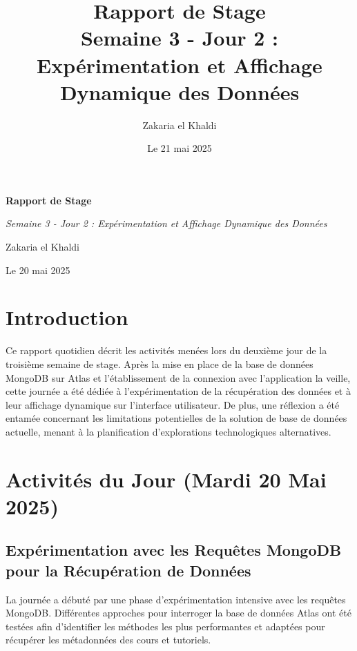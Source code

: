 \documentclass[12pt, a4paper]{article}
\title{\Huge\bfseries\color{primary} Rapport de Stage \\ 
      \Large Semaine 3 - Jour 2 : Expérimentation et Affichage Dynamique des Données} %
\author{\Large Zakaria el Khaldi}
\date{\large Le 21 mai 2025} %
\begin{document}
\begin{titlepage}
  \centering
  {\Huge\bfseries\color{primary} Rapport de Stage \par}
  \vspace{1cm}
  {\Large\itshape Semaine 3 - Jour 2 : Expérimentation et Affichage Dynamique des Données\par} %
  \vspace{2cm}
  
  \vspace{2cm}
  {\Large Zakaria el Khaldi\par}
  \vfill
  {\large Le 20 mai 2025\par} %
\end{titlepage}

\tableofcontents
\thispagestyle{empty}
\newpage

\section{Introduction}
\thispagestyle{fancy}
Ce rapport quotidien décrit les activités menées lors du deuxième jour de la troisième semaine de stage. Après la mise en place de la base de données MongoDB sur Atlas et l'établissement de la connexion avec l'application la veille, cette journée a été dédiée à l'expérimentation de la récupération des données et à leur affichage dynamique sur l'interface utilisateur. De plus, une réflexion a été entamée concernant les limitations potentielles de la solution de base de données actuelle, menant à la planification d'explorations technologiques alternatives.

\section{Activités du Jour (Mardi 20 Mai 2025)} %

\subsection{Expérimentation avec les Requêtes MongoDB pour la Récupération de Données}
La journée a débuté par une phase d'expérimentation intensive avec les requêtes MongoDB. Différentes approches pour interroger la base de données Atlas ont été testées afin d'identifier les méthodes les plus performantes et adaptées pour récupérer les métadonnées des cours et tutoriels.
\end{document}
